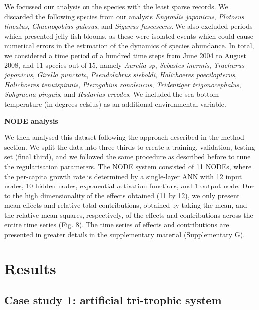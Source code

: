 \documentclass[11pt, oneside]{article}
\begin{document}
We focussed our analysis on the species with the least sparse records.
We discarded the following species from our analysis \textit{Engraulis japonicus}, \textit{Plotosus lineatus}, \textit{Chaenogobius gulosus}, and \textit{Siganus fuscescens}.
We also excluded periods which presented jelly fish blooms, as these were isolated events which could cause numerical errors in the estimation of the dynamics of species abundance.
In total, we considered a time period of a hundred time steps from June 2004 to August 2008, and 11 species out of 15, namely \textit{Aurelia sp}, \textit{Sebastes inermis}, \textit{Trachurus japonicus}, \textit{Girella punctata}, \textit{Pseudolabrus sieboldi}, \textit{Halichoeres poecilopterus}, \textit{Halichoeres tenuispinnis}, \textit{Pterogobius zonoleucus}, \textit{Tridentiger trigonocephalus}, \textit{Sphyraena pinguis}, and \textit{Rudarius ercodes}.
We included the sea bottom temperature (in degrees celsius) as an additional environmental variable.

\textbf{NODE analysis}

We then analysed this dataset following the approach described in the method section. 
We split the data into three thirds to create a training, validation, testing set (final third), and we followed the same procedure as described before to tune the regularisation parameters.
The NODE system consisted of 11 NODEs, where the per-capita growth rate is determined by a single-layer ANN with 12 input nodes, 10 hidden nodes, exponential activation functions, and 1 output node.
Due to the high dimensionality of the effects obtained (11 by 12), we only present mean effects and relative total contributions, obtained by taking the mean, and the relative mean squares, respectively, of the effects and contributions across the entire time series (Fig. 8).
The time series of effects and contributions are presented in greater details in the supplementary material (Supplementary G).

\section{Results}

\subsection{Case study 1: artificial tri-trophic system}
\end{document}
